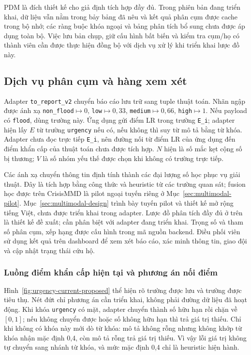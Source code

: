 PDM là đích thiết kế cho giả định tích hợp đầy đủ. Trong phiên bản đang triển khai, dữ liệu vẫn nằm trong bảy bảng đã nêu và kết quả phân cụm được cache trong bộ nhớ; các ràng buộc khóa ngoại và bảng phân tích bổ sung chưa được áp dụng toàn bộ. Việc lưu bản chụp, giữ cấu hình bất biến và kiểm tra cụm/họ có thành viên cần được thực hiện đồng bộ với dịch vụ xử lý khi triển khai lược đồ này.

\subsection{Dịch vụ phân cụm và hàng xem xét}
Adapter \texttt{to\_report\_v2} chuyển báo cáo lưu trữ sang tuple thuật toán. Nhãn ngập được ánh xạ \texttt{non\_flood}$\mapsto0$, \texttt{low}$\mapsto0{,}33$, \texttt{medium}$\mapsto0{,}66$, \texttt{high}$\mapsto1$. Nếu payload có \texttt{flood}, dùng trường này. Ứng dụng gửi điểm LR trong trường \texttt{E\_i}; adapter hiện lấy $E$ từ trường \texttt{urgency} nếu có, nếu không thì suy từ mô tả bằng từ khóa. Adapter chưa đọc trực tiếp \texttt{E\_i}, nên đường nối từ điểm LR của ứng dụng đến điểm khẩn cấp của thuật toán chưa được tích hợp. $N$ hiện là số mắc kẹt cộng số bị thương; $V$ là số nhóm yếu thế được chọn khi không có trường trực tiếp.

Các ánh xạ chuyển thông tin định tính thành các đại lượng số học phục vụ giải thuật. Đây là tích hợp bằng công thức và heuristic từ các trường quan sát; fusion học được trên CrisisMMD là pilot ngoại tuyến riêng ở Mục~\ref{sec:multimodal-pilot}. Mục~\ref{sec:multimodal-design} trình bày tuyến pilot và thiết kế mở rộng tiếng Việt, chưa được triển khai trong adapter. Lược đồ phân tích đầy đủ ở trên là thiết kế đề xuất; cần phân biệt với adapter đang triển khai. Trọng số và tham số phân cụm, xếp hạng được cấu hình trong mã nguồn backend. Điều phối viên sử dụng kết quả trên dashboard để xem xét báo cáo, xác minh thông tin, giao đội và cập nhật trạng thái cứu hộ.

\subsubsection{Luồng điểm khẩn cấp hiện tại và phương án nối điểm}
Hình~\ref{fig:urgency-current-proposed} thể hiện rõ trường được lưu và trường được tiêu thụ. Nét đứt chỉ phương án cần triển khai, không phải đường dữ liệu đã hoạt động. Khi khóa \texttt{urgency} có mặt, adapter chuyển thành số hữu hạn rồi chặn về $[0,1]$; nếu không chuyển được hoặc số không hữu hạn thì trả giá trị thiếu. Chỉ khi không có khóa này mới dò từ khóa: mô tả không rỗng nhưng không khớp từ khóa nhận mặc định 0,4, còn mô tả rỗng trả giá trị thiếu. Vì vậy lỗi giá trị không tự chuyển sang nhánh từ khóa, và mức mặc định 0,4 chỉ là heuristic hiện hành.

